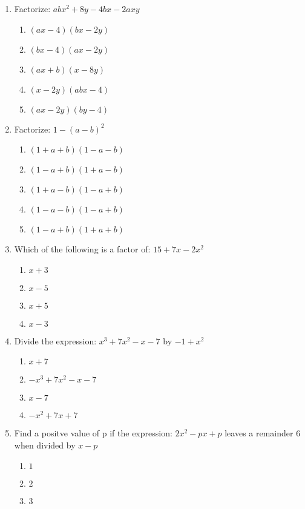 \begin{multicols}{2}
\begin{enumerate}[label={\arabic*.}]
    \item Factorize: \(abx^2 + 8y -4bx - 2axy\)
      \begin{enumerate}[label={\Alph*.}]
        \item \((ax -4)(bx-2y)\)
        \item \((bx-4)(ax-2y)\)
        \item \((ax+b)(x-8y)\)
        \item \((x-2y)(abx-4)\)
        \item \((ax-2y)(by-4)\)
      \end{enumerate}
    \item Factorize: \(1 - {(a-b)}^2\)
      \begin{enumerate}[label={\Alph*.}]
        \item \((1 +a+b)(1-a-b)\)
        \item \((1-a + b)(1+ a -b)\)
        \item \((1 + a - b)(1-a+b)\)
        \item \((1 -a -b)(1-a + b)\)
        \item \((1 -a +b)(1+a + b)\)
      \end{enumerate}
    \item Which of the following is a factor of: $15 + 7x -2x^2$
      \begin{enumerate}[label={\Alph*.}]
        \item \(x +3\)
        \item \(x-5\)
        \item \(x+5\)
        \item \(x-3\)
      \end{enumerate}
    \item Divide the expression: $x^3 + 7x^2 -x -7$ by $-1 + x^2$
      \begin{enumerate}[label={\Alph*.}]
        \item \(x+7\)
        \item \(-x^3 + 7x^2 -x -7\)
        \item \(x-7\)
        \item \(-x^2 + 7x + 7\)
      \end{enumerate}
    \item Find a positve value of p if the expression: $2x^2 - px + p$ leaves a remainder 6 when divided by $x-p$
      \begin{enumerate}[label={\Alph*.}]
        \item \(1\)
        \item \(2\)
        \item \(3\)

\end{enumerate}
\end{enumerate}
\end{multicols}
